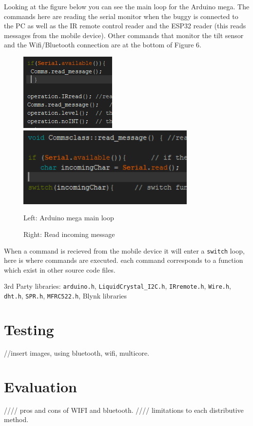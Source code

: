 \documentclass[8pt, a4paper]{article}
\begin{document}
Looking at the figure below you can see the main loop for the Arduino mega. The commands here are reading the serial monitor when the buggy is connected to the PC as well as the IR remote control reader and the ESP32 reader (this reads messages from the mobile device). Other commands that monitor the tilt sensor and the Wifi/Bluetooth connection are at the bottom of Figure 6. 

\begin{figure}[h]
\centering
\includegraphics[]{main_loop}
\includegraphics[height=4cm]{read_message}
\caption{Left: Arduino mega main loop}
\caption{Right: Read incoming message}
\end{figure}

When a command is recieved from the mobile device it will enter a \verb|switch| loop, here is where commands are executed. each command corresponds to a function which exist in other source code files. 



3rd Party libraries:
\verb|arduino.h|, \verb|LiquidCrystal_I2C.h|, \verb|IRremote.h|, \verb|Wire.h|, \verb|dht.h|, \verb|SPR.h|, \verb|MFRC522.h|, Blynk libraries


\section{Testing}
//insert images, using bluetooth, wifi, multicore. 


\section{Evaluation}

//// pros and cons of WIFI and bluetooth.
//// limitations to each distributive method.  
\end{document}
